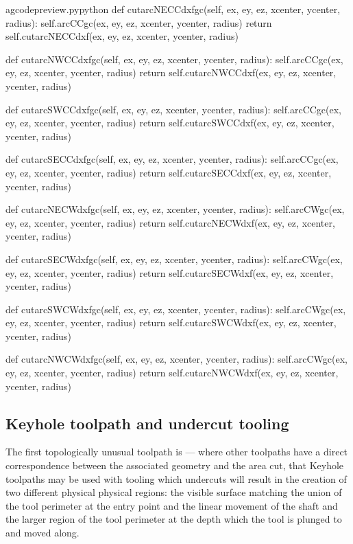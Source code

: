 \documentclass{ltxdoc}
\begin{document}
\lstset{firstnumber=\thegcpy}
\begin{writecode}{a}{gcodepreview.py}{python}
    def cutarcNECCdxfgc(self, ex, ey, ez, xcenter, ycenter, radius):
        self.arcCCgc(ex, ey, ez, xcenter, ycenter, radius)
        return self.cutarcNECCdxf(ex, ey, ez, xcenter, ycenter, radius)

    def cutarcNWCCdxfgc(self, ex, ey, ez, xcenter, ycenter, radius):
        self.arcCCgc(ex, ey, ez, xcenter, ycenter, radius)
        return self.cutarcNWCCdxf(ex, ey, ez, xcenter, ycenter, radius)

    def cutarcSWCCdxfgc(self, ex, ey, ez, xcenter, ycenter, radius):
        self.arcCCgc(ex, ey, ez, xcenter, ycenter, radius)
        return self.cutarcSWCCdxf(ex, ey, ez, xcenter, ycenter, radius)

    def cutarcSECCdxfgc(self, ex, ey, ez, xcenter, ycenter, radius):
        self.arcCCgc(ex, ey, ez, xcenter, ycenter, radius)
        return self.cutarcSECCdxf(ex, ey, ez, xcenter, ycenter, radius)

    def cutarcNECWdxfgc(self, ex, ey, ez, xcenter, ycenter, radius):
        self.arcCWgc(ex, ey, ez, xcenter, ycenter, radius)
        return self.cutarcNECWdxf(ex, ey, ez, xcenter, ycenter, radius)

    def cutarcSECWdxfgc(self, ex, ey, ez, xcenter, ycenter, radius):
        self.arcCWgc(ex, ey, ez, xcenter, ycenter, radius)
        return self.cutarcSECWdxf(ex, ey, ez, xcenter, ycenter, radius)

    def cutarcSWCWdxfgc(self, ex, ey, ez, xcenter, ycenter, radius):
        self.arcCWgc(ex, ey, ez, xcenter, ycenter, radius)
        return self.cutarcSWCWdxf(ex, ey, ez, xcenter, ycenter, radius)

    def cutarcNWCWdxfgc(self, ex, ey, ez, xcenter, ycenter, radius):
        self.arcCWgc(ex, ey, ez, xcenter, ycenter, radius)
        return self.cutarcNWCWdxf(ex, ey, ez, xcenter, ycenter, radius)

\end{writecode}
\addtocounter{gcpy}{32}

\subsection{Keyhole toolpath and undercut tooling}
 
\label{subsec:keyholetoolpaths}
The first topologically unusual toolpath is  --- where other toolpaths have a direct correspondence between the associated geometry and the area cut, that Keyhole toolpaths may be used with tooling which undercuts will result in the creation of two different physical physical regions: the visible surface matching the union of the tool perimeter at the entry point and the linear movement of the shaft and the larger region of the tool perimeter at the depth which the tool is plunged to and moved along.
 
\end{document}
